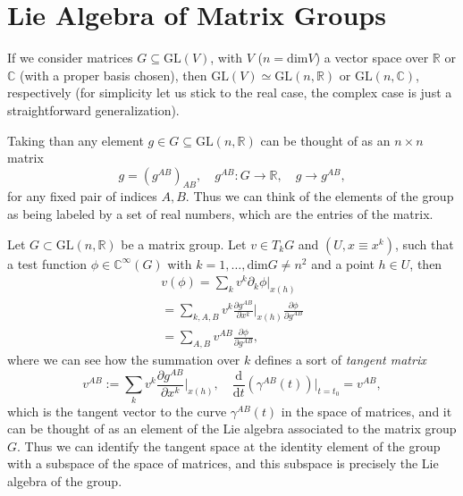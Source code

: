 \section{Lie Algebra of Matrix Groups}

If we consider matrices \(G \subseteq \mathrm{GL}(V)\), with \(V\) (\(n = \text{dim}V\)) a vector space over \(\mathbb{R}\) or \(\mathbb{C}\) (with a proper basis chosen), then \(\mathrm{GL}(V) \simeq \mathrm{GL}(n, \mathbb{R})\) or \(\mathrm{GL}(n, \mathbb{C})\), respectively (for simplicity let us stick to the real case, the complex case is just a straightforward generalization).

Taking than any element \(g \in G \subseteq \mathrm{GL}(n, \mathbb{R})\) can be thought of as an \(n \times n\) matrix
\[
    g = (g^{AB})_{AB}, \quad g^{AB} : G \to \mathbb{R}, \quad g \to g^{AB},
\]
for any fixed pair of indices \(A,B\). Thus we can think of the elements of the group as being labeled by a set of real numbers, which are the entries of the matrix.

\begin{definition}
    Let \(G \subset \mathrm{GL}(n, \mathbb{R})\) be a matrix group. Let \(v \in T_k G\) and \((U,x\equiv x^k)\), such that a test function \(\phi \in \mathbb{C}^{\infty}(G)\) with \(k = 1,\dots , \text{dim}G \neq n^2\) and a point \(h \in U\), then
    \[
        \begin{aligned}
            v(\phi) = \sum_{k} v^k \partial_k \phi \big|_{x(h)}                                                         \\
            = \sum_{k,A,B} v^k \frac{\partial g^{AB}}{\partial x^k} \bigg|_{x(h)} \frac{\partial \phi}{\partial g^{AB}} \\
            = \sum_{A,B} v^{AB} \frac{\partial \phi}{\partial g^{AB}},
        \end{aligned}
    \]
    where we can see how the summation over \(k\) defines a sort of \textit{tangent matrix}
    \[
        v^{AB} := \sum_{k} v^k \frac{\partial g^{AB}}{\partial x^k} \bigg|_{x(h)}, \quad \frac{\mathrm{d}}{\mathrm{d} t} (\gamma^{AB}(t)) \bigg|_{t=t_0} = v^{AB},
    \]
    which is the tangent vector to the curve \(\gamma^{AB}(t)\) in the space of matrices, and it can be thought of as an element of the Lie algebra associated to the matrix group \(G\). Thus we can identify the tangent space at the identity element of the group with a subspace of the space of matrices, and this subspace is precisely the Lie algebra of the group.
\end{definition}





